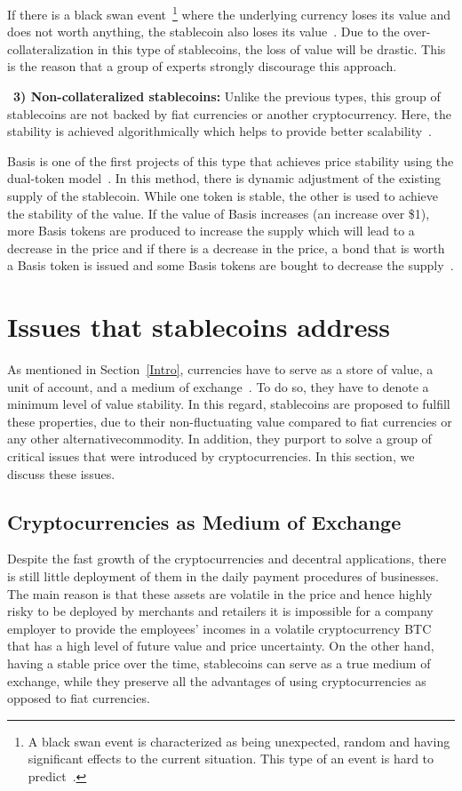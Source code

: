 If there is a black swan event~\footnote{A black swan event is characterized as being unexpected, random and having significant effects to the current situation. This type of an event is hard to predict~\cite{swan}.} where the underlying currency loses its value and does not worth anything, the stablecoin also loses its value~\cite{coinsexplained}.  Due to the over-collateralization in this type of stablecoins, the loss of value will be drastic. This is the reason that a group of experts strongly discourage this approach.

~\textbf{3) Non-collateralized stablecoins:} Unlike the previous types, this group of stablecoins are not backed by fiat currencies or another cryptocurrency. Here, the stability is achieved algorithmically which helps to provide better scalability~\cite{report}.

Basis is one of the first projects of this type that achieves price stability using the dual-token model~\cite{cryptoinsider}. In this method, there is dynamic adjustment of the existing supply of the stablecoin. While one token is stable, the other is used to achieve the stability of the value. If the value of Basis increases (an increase over \$1), more Basis tokens are produced to increase the supply which will lead to a decrease in the price and if there is a decrease in the price, a bond that is worth a Basis token is issued and some Basis tokens are bought to decrease the supply~\cite{euromoney}.


\section{Issues that stablecoins address}
As mentioned in Section~\ref{Intro}, currencies have to serve as a store of value, a unit of account, and a medium of exchange~\cite{smithin2002money}. To do so, they have to denote a minimum level of value stability. In this regard, stablecoins are proposed to fulfill these properties, due to their non-fluctuating value compared to fiat currencies or any other alternative\eg commodity. In addition, they purport to solve a group of critical issues that were introduced by cryptocurrencies. In this section, we discuss these issues.

\subsection{Cryptocurrencies as Medium of Exchange}
Despite the fast growth of the cryptocurrencies and decentral applications, there is still little deployment of them in the daily payment procedures of businesses. The main reason is that these assets are volatile in the price and hence highly risky to be deployed by merchants and retailers \ie it is impossible for a company employer to provide the employees' incomes in a volatile cryptocurrency \eg BTC that has a high level of future value and price uncertainty. On the other hand, having a stable price over the time, stablecoins can serve as a true medium of exchange, while they preserve all the advantages of using cryptocurrencies as opposed to fiat currencies.

